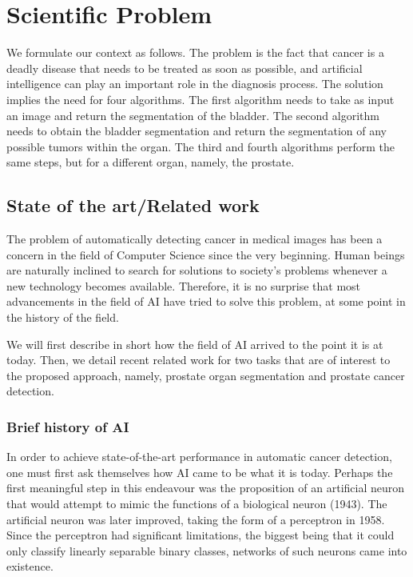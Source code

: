 \documentclass[runningheads,a4paper,11pt]{report}
\begin{document}
\chapter{Scientific Problem}
\label{chapter:problem}

We formulate our context as follows. The problem is the fact that cancer is a deadly disease that needs to be treated as soon as possible, and artificial intelligence can play an important role in the diagnosis process. The solution implies the need for four algorithms. The first algorithm needs to take as input an image and return the segmentation of the bladder. The second algorithm needs to obtain the bladder segmentation and return the segmentation of any possible tumors within the organ. The third and fourth algorithms perform the same steps, but for a different organ, namely, the prostate.

\section{State of the art/Related work}
\label{chapter:stateOfArt}

The problem of automatically detecting cancer in medical images has been a concern in the field of Computer Science since the very beginning. Human beings are naturally inclined to search for solutions to society's problems whenever a new technology becomes available. Therefore, it is no surprise that most advancements in the field of AI have tried to solve this problem, at some point in the history of the field. 

We will first describe in short how the field of AI arrived to the point it is at today. Then, we detail recent related work for two tasks that are of interest to the proposed approach, namely, prostate organ segmentation and prostate cancer detection.

\subsection{Brief history of AI}
In order to achieve state-of-the-art performance in automatic cancer detection, one must first ask themselves how AI came to be what it is today. Perhaps the first meaningful step in this endeavour was the proposition of an artificial neuron that would attempt to mimic the functions of a biological neuron (1943). The artificial neuron was later improved, taking the form of a perceptron in 1958. Since the perceptron had significant limitations, the biggest being that it could only classify linearly separable binary classes, networks of such neurons came into existence.
\end{document}
